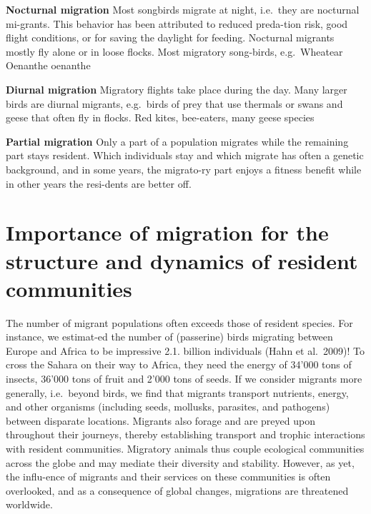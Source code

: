 \documentclass[
]{book}
\begin{document}
\textbf{Nocturnal migration} Most songbirds migrate at night, i.e.~they are nocturnal mi-grants. This behavior has been attributed to reduced preda-tion risk, good flight conditions, or for saving the daylight for feeding. Nocturnal migrants mostly fly alone or in loose flocks. Most migratory song-birds, e.g.~Wheatear Oenanthe oenanthe

\textbf{Diurnal migration} Migratory flights take place during the day. Many larger birds are diurnal migrants, e.g.~birds of prey that use thermals or swans and geese that often fly in flocks. Red kites, bee-eaters, many geese species

\textbf{Partial migration} Only a part of a population migrates while the remaining part stays resident. Which individuals stay and which migrate has often a genetic background, and in some years, the migrato-ry part enjoys a fitness benefit while in other years the resi-dents are better off.

\hypertarget{importance-of-migration-for-the-structure-and-dynamics-of-resident-communities}{%
\section{Importance of migration for the structure and dynamics of resident communities}\label{importance-of-migration-for-the-structure-and-dynamics-of-resident-communities}}

The number of migrant populations often exceeds those of resident species. For instance, we estimat-ed the number of (passerine) birds migrating between Europe and Africa to be impressive 2.1. billion individuals (Hahn et al.~2009)! To cross the Sahara on their way to Africa, they need the energy of 34'000 tons of insects, 36'000 tons of fruit and 2'000 tons of seeds.
If we consider migrants more generally, i.e.~beyond birds, we find that migrants transport nutrients, energy, and other organisms (including seeds, mollusks, parasites, and pathogens) between disparate locations. Migrants also forage and are preyed upon throughout their journeys, thereby establishing transport and trophic interactions with resident communities. Migratory animals thus couple ecological communities across the globe and may mediate their diversity and stability. However, as yet, the influ-ence of migrants and their services on these communities is often overlooked, and as a consequence of global changes, migrations are threatened worldwide.
\end{document}
